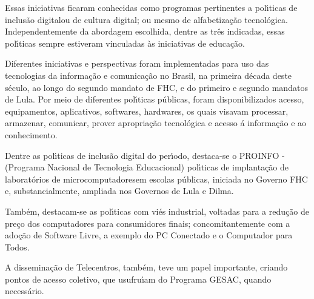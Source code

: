 \documentclass[
12pt,		%
openright,	%
twoside,  %
a4paper,			%
chapter=TITLE,		%
english,			%
french,				%
spanish,			%
brazil				%
]{USPSC-classe/USPSC}
\begin{document}
Essas iniciativas ficaram conhecidas como programas pertinentes a pol\'{\i}ticas de \textquotedbl inclus\~ao digital\textquotedbl  ou  de \textquotedbl cultura digital\textquotedbl ; ou mesmo de \textquotedbl alfabetiza\c{c}\~ao tecnol\'ogica\textquotedbl . Independentemente da abordagem escolhida, dentre as tr\^es indicadas, essas pol\'{\i}ticas sempre estiveram vinculadas \`as iniciativas de educa\c{c}\~ao.









Diferentes iniciativas e perspectivas foram implementadas para uso das tecnologias da informa\c{c}\~ao e comunica\c{c}\~ao no Brasil, na primeira d\'ecada deste s\'eculo, ao longo do segundo mandato de FHC, e do primeiro e segundo mandatos de Lula. Por meio de diferentes pol\'{\i}ticas p\'ublicas, foram disponibilizados acesso, equipamentos, aplicativos, softwares, hardwares, os quais visavam processar, armazenar, comunicar, prover apropria\c{c}\~ao tecnol\'ogica e acesso \'a informa\c{c}\~ao e ao conhecimento.









Dentre as pol\'{\i}ticas de inclus\~ao digital do per\'{\i}odo, destaca-se o  PROINFO - (Programa Nacional de Tecnologia Educacional) pol\'{\i}ticas de implanta\c{c}\~ao de \textquotedbl laborat\'orios de microcomputadores\textquotedbl  em escolas p\'ublicas, iniciada no Governo FHC e, substancialmente, ampliada nos Governos de Lula e Dilma.









Tamb\'em, destacam-se as pol\'{\i}ticas com vi\'es industrial, voltadas para a redu\c{c}\~ao de pre\c{c}o dos computadores para consumidores finais; concomitantemente com a ado\c{c}\~ao de Software Livre, a exemplo do PC Conectado e o Computador para Todos.









A dissemina\c{c}\~ao de Telecentros, tamb\'em, teve um papel importante, criando pontos de acesso coletivo, que usufru\'{\i}am do Programa GESAC, quando necess\'ario.
\end{document}
